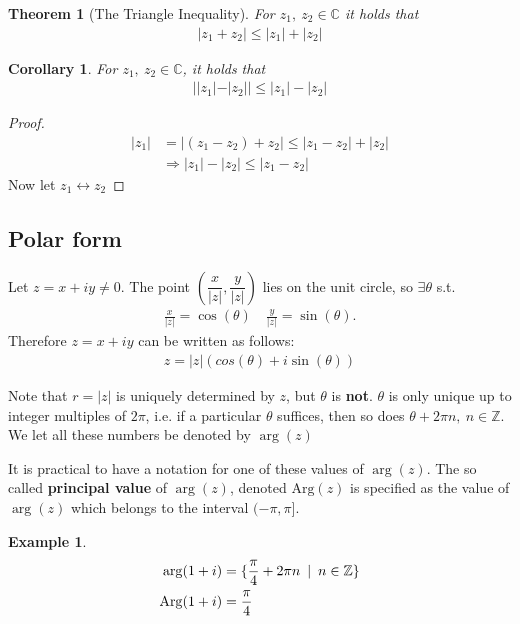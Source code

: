 \documentclass[12pt, a4paper]{article}
\theoremstyle{plain}
\newtheorem{thm}{Theorem} %
\newtheorem{cor}{Corollary}
\theoremstyle{definition}
\newtheorem{example}[section]{Example} %
\begin{document}
			\begin{thm}[The Triangle Inequality]
				For $z_1,\:z_2\in\mathbb{C}$ it holds that
				\begin{align*}
					|z_1+z_2|\le |z_1|+|z_2|
				\end{align*}
			\end{thm}

			\begin{cor}
				For $z_1,\:z_2\in\mathbb{C}$, it holds that
				\begin{align*}
					||z_1|-|z_2||\le |z_1|-|z_2|
				\end{align*}
			\end{cor}

			\begin{proof}
				\begin{align*}
					|z_1| &= |(z_1-z_2)+z_2|\le|z_1-z_2|+|z_2|\\
					&\Rightarrow |z_1|-|z_2|\le|z_1-z_2|
				\end{align*}
				Now let $z_1\longleftrightarrow z_2$
			\end{proof}

			\subsection{Polar form} %
			\label{sub:polar_form}
				Let $z=x+iy\not=0$. The point $\left(\dfrac{x}{|z|},\dfrac{y}{|z|}\right)$ lies on the unit circle, so $\exists\theta$ s.t. 
				\begin{align*}
					\frac{x}{|z|} = \cos(\theta)\quad\frac{y}{|z|} = \sin(\theta).
				\end{align*}
				Therefore $z=x+iy$ can be written as follows:
				\begin{align*}
					z=|z|(cos(\theta)+i\sin(\theta))
				\end{align*}

				Note that $r=|z|$ is uniquely determined by $z$, but $\theta$ is \textbf{not}. $\theta$ is only unique up to integer multiples of $2\pi$, i.e. if a particular $\theta$ suffices, then so does $\theta+2\pi n,\: n\in\mathbb{Z}$. We let all these numbers be denoted by $\arg(z)$

				It is practical to have a notation for one of these values of $\arg(z)$. The so called \textbf{principal value} of $\arg(z)$, denoted $\mathrm{Arg}(z)$ is specified as the value of $\arg(z)$ which belongs to the interval $(-\pi,\pi]$.\\

				\begin{example}
					\begin{align*}
						\arg(1+i) &= \{\frac{\pi}{4}+2\pi n\enskip|\enskip n\in\mathbb{Z}\}\\
						\mathrm{Arg}(1+i) &= \frac{\pi}{4}
					\end{align*}
				\end{example}
\end{document}
